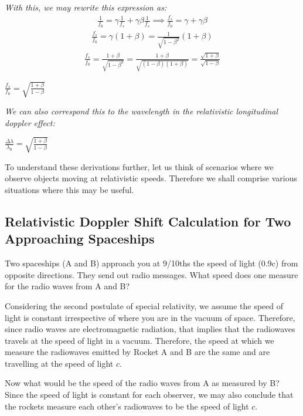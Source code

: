 \documentclass{article}
\begin{document}
\textit{With this, we may rewrite this expression as:}
\begin{gather*}
\frac{1}{f_0} = \gamma\frac{1}{f_s} + \gamma\beta\frac{1}{f_s} \implies \frac{f_s}{f_0} = \gamma + \gamma\beta
\end{gather*}
\begin{gather*}
\frac{f_s}{f_0} = \gamma(1+\beta) = \frac{1}{\sqrt{1-\beta^2}}(1+\beta)
\end{gather*}
\begin{gather*}
	\frac{f_s}{f_0} = \frac{1+\beta}{\sqrt{1-\beta^2}} = \frac{1+\beta}{\sqrt{(1-\beta)(1+\beta)}} = \frac{\sqrt{1+\beta}}{\sqrt{1-\beta}}
\end{gather*}
\begin{center}
	$\boxed{\frac{f_s}{f_0} = \sqrt{\frac{1+\beta}{1-\beta}}}
	$
\end{center}
\textit{We can also correspond this to the wavelength in the relativistic longitudinal doppler effect: }
\begin{center}
	$\boxed{\frac{\Delta\lambda}{\lambda_0} = \sqrt{\frac{1+\beta}{1-\beta}}}
$
\end{center}

To understand these derivations further, let us think of scenarios where we observe objects moving at relativistic speeds. Therefore we shall comprise various situations where this may be useful.

\subsection{Relativistic Doppler Shift Calculation for Two Approaching Spaceships}

Two spaceships (A and B) approach you at 9/10ths the speed of light (0.9c) from opposite directions. They send out radio messages. What speed does one measure for the radio waves from A and B? 


Considering the second postulate of special relativity, we assume the speed of light is constant irrespective of where you are in the vacuum of space. Therefore, since radio waves are electromagnetic radiation, that implies that the radiowaves travels at the speed of light in a vacuum. Therefore, the speed at which we measure the radiowaves emitted by Rocket A and B are the same and are travelling at the speed of light $c$. 


Now what would be the speed of the radio waves from A as measured by B? Since the speed of light is constant for each observer, we may also conclude that the rockets measure each other's radiowaves to be the speed of light $c$.
\end{document}
